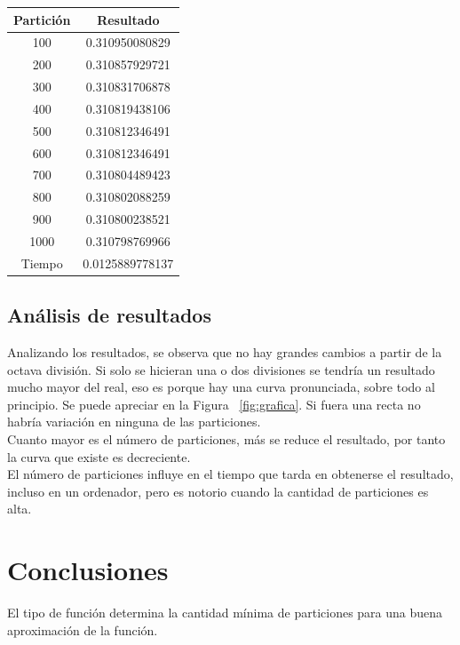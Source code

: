 \documentclass{article}
\begin{document}
     \vspace{0.4cm}
    \begin{center}
     \begin{tabular}{|c|c|}
      \hline
      Partición & Resultado\\
      \hline
      100 & 0.310950080829\\ 
      \hline
      200 & 0.310857929721\\ 
      \hline
      300 & 0.310831706878\\ 
      \hline
      400 & 0.310819438106\\
      \hline
      500 & 0.310812346491\\
      \hline
      600 & 0.310812346491\\
      \hline
      700 & 0.310804489423\\ 
      \hline
      800 & 0.310802088259\\
      \hline
      900 & 0.310800238521\\
	  \hline
      1000 & 0.310798769966\\ 
      \hline
      Tiempo & 0.0125889778137\\ \hline
     \end{tabular} 
    \end{center}
    \subsection{Análisis de resultados}

     Analizando los resultados, se observa que no hay grandes cambios a partir de la octava división. Si solo se hicieran una o dos divisiones se tendría un resultado mucho mayor del real, eso es porque hay una curva pronunciada, sobre todo al principio. Se puede apreciar en la Figura ~\ref{fig:grafica}. Si fuera una recta no habría variación en ninguna de las particiones.\\

     Cuanto mayor es el número de particiones, más se reduce el resultado, por tanto la curva que existe es decreciente.\\

     El número de particiones influye en el tiempo que tarda en obtenerse el resultado, incluso en un ordenador, pero es notorio cuando la cantidad de particiones es alta.\\


    \pagebreak

   \section{Conclusiones}
    El tipo de función determina la cantidad mínima de particiones para una buena aproximación de la función.\\
\end{document}
